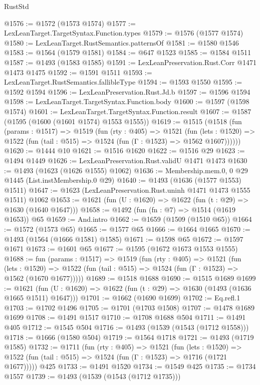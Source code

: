 \begin{lexlean}{RustStd}
\begin{coremodule}
@1576 := @1572 (@1573 @1574)
@1577 := LexLeanTarget.TargetSyntax.Function.types
@1579 := @1576 (@1577 @1574)
@1580 := LexLeanTarget.RustSemantics.patternsOf
@1581 := @1580 @1546
@1583 := @1564 (@1579 @1581)
@1584 := @647 @1523
@1585 := @1584 @1511
@1587 := @1493 (@1583 @1585)
@1591 := LexLeanPreservation.Rust.Corr @1471 @1473 @1475
@1592 := @1591 @1511
@1593 := LexLeanTarget.RustSemantics.fallibleType
@1594 := @1593 @1550
@1595 := @1592 @1594
@1596 := LexLeanPreservation.Rust.Jd.b
@1597 := @1596 @1594
@1598 := LexLeanTarget.TargetSyntax.Function.body
@1600 := @1597 (@1598 @1574)
@1601 := LexLeanTarget.TargetSyntax.Function.result
@1607 := @1587 (@1595 (@1600 (@1601 @1574) @1553 @1555))
@1619 := @1515
    (@1518
      (fun (params : @1517) =>
      @1519
        (fun (rty : @405) =>
        @1521
          (fun (lets : @1520) =>
          @1522 (fun (tail : @515) => @1524 (fun (Γ : @1523) => @1562 @1607))))))
@1620 := @1444 @10
@1621 := @1516 @1620
@1622 := @1516 @29
@1623 := @1494 @1449
@1626 := LexLeanPreservation.Rust.validU @1471 @1473
@1630 := @1493 (@1623 (@1626 @1555) @1062)
@1636 := Membership.mem.{0, 0} @29 @1445 (List.instMembership.{0} @29)
@1640 := @1493 (@1636 (@1577 @1553) @1511)
@1647 := @1623 (LexLeanPreservation.Rust.uninh @1471 @1473 @1555 @1511) @1062
@1653 := @1621 (fun (U : @1620) => @1622 (fun (t : @29) => @1630 (@1640 @1647)))
@1658 := @1492 (fun (fn : @7) => @1514 (@1619 @1653)) @65
@1659 := And.intro
@1662 := @1659 (@1509 (@1510 @65))
@1664 := @1572 (@1573 @65)
@1665 := @1577 @65
@1666 := @1664 @1665
@1670 := @1493 (@1564 (@1666 @1581) @1585)
@1671 := @1598 @65
@1672 := @1597 @1671
@1673 := @1601 @65
@1677 := @1595 (@1672 @1673 @1553 @1555)
@1688 := fun (params : @1517) =>
  @1519
    (fun (rty : @405) =>
    @1521
      (fun (lets : @1520) =>
      @1522 (fun (tail : @515) => @1524 (fun (Γ : @1523) => @1562 (@1670 @1677)))))
@1689 := @1518 @1688
@1690 := @1515 @1689
@1699 := @1621 (fun (U : @1620) => @1622 (fun (t : @29) => @1630 (@1493 (@1636 @1665 @1511) @1647)))
@1701 := @1662 (@1690 @1699)
@1702 := Eq.refl.{1}
@1703 := @1702 @1496
@1705 := @1701 (@1703 @1508)
@1707 := @1478 @1689 @1699
@1708 := @1491 @1517
@1710 := @1708 @1688 @504
@1711 := @1491 @405
@1712 := @1545 @504
@1716 := @1493 (@1539 (@1543 (@1712 @1558)))
@1718 := @1666 (@1580 @504)
@1719 := @1564 @1718
@1721 := @1493 (@1719 @1585)
@1732 := @1711
    (fun (rty : @405) =>
    @1521
      (fun (lets : @1520) =>
      @1522 (fun (tail : @515) => @1524 (fun (Γ : @1523) => @1716 (@1721 @1677)))))
    @425
@1733 := @1491 @1520
@1734 := @1549 @425
@1735 := @1734 @1557
@1739 := @1493 (@1539 (@1543 (@1712 @1735)))

\end{coremodule}
\end{lexlean}
